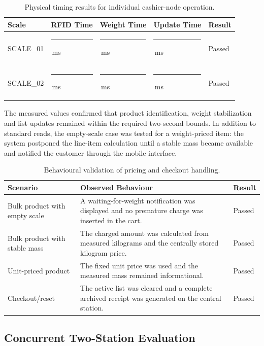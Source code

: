 \documentclass[11pt,a4paper]{article}
\newcommand{\blankvalue}[1]{\rule{#1}{0.4pt}}
\newcommand{\blankms}{\blankvalue{1.35cm}\,ms}
\begin{document}
\begin{table}[H]
\centering
\small
\caption{Physical timing results for individual cashier-node operation.}
\label{tab:physical-individual}
\begin{tabularx}{\textwidth}{@{}p{}p{}p{}p{}Y@{}}
\toprule
\textbf{Scale} & \textbf{RFID Time} & \textbf{Weight Time} & \textbf{Update Time} & \textbf{Result} \\
\midrule
SCALE\_01 & \blankms & \blankms & \blankms & Passed \\
SCALE\_02 & \blankms & \blankms & \blankms & Passed \\
\bottomrule
\end{tabularx}
\end{table}



The measured values confirmed that product identification, weight stabilization and list updates remained within the required two-second bounds. In addition to standard reads, the empty-scale case was tested for a weight-priced item: the system postponed the line-item calculation until a stable mass became available and notified the customer through the mobile interface.

\begin{table}[H]
\centering
\small
\caption{Behavioural validation of pricing and checkout handling.}
\label{tab:physical-behaviour}
\begin{tabularx}{\textwidth}{@{}p{}Y p{0.16\textwidth}@{}}
\toprule
\textbf{Scenario} & \textbf{Observed Behaviour} & \textbf{Result} \\
\midrule
Bulk product with empty scale & A waiting-for-weight notification was displayed and no premature charge was inserted in the cart. & Passed \\
Bulk product with stable mass & The charged amount was calculated from measured kilograms and the centrally stored kilogram price. & Passed \\
Unit-priced product & The fixed unit price was used and the measured mass remained informational. & Passed \\
Checkout/reset & The active list was cleared and a complete archived receipt was generated on the central station. & Passed \\
\bottomrule
\end{tabularx}
\end{table}

\subsection{Concurrent Two-Station Evaluation}
\end{document}
